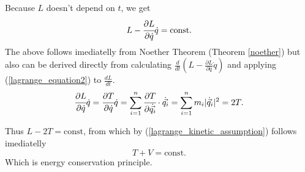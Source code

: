\documentclass[main.tex]{subfiles}
\begin{document}
Because $L$ doesn't depend on $t$, we get
\begin{equation}
L - \cfrac{\partial L}{\partial \dot{q}} \dot{q} = \text{const}.
\end{equation}
The above follows imediatelly from Noether Theorem (Theorem \ref{noether}) but also can be derived directly from calculating $\frac{d}{dt}(L - \frac{\partial L}{\partial \dot{q}} \dot{q})$ and applying (\ref{lagrange_equation2}) to $\frac{dL}{dt}$.
\begin{equation}
\label{energy-coserv-simple}
\cfrac{\partial L}{\partial \dot{q}} \dot{q} = \cfrac{\partial T}{\partial \dot{q}} \dot{q} = \sum_{i=1}^n \cfrac{\partial T}{\partial \dot{\vec{q_i}}} \cdot \dot{\vec{q_i}} = \sum_{i=1}^n m_i|\dot{\vec{q}}_i|^2 = 2T.
\end{equation}

Thus $L - 2T = \text{const}$, from which by (\ref{lagrange_kinetic_assumption}) follows imediatelly
\begin{equation}
T + V = \text{const}.
\end{equation}
Which is energy conservation principle.
\end{document}
